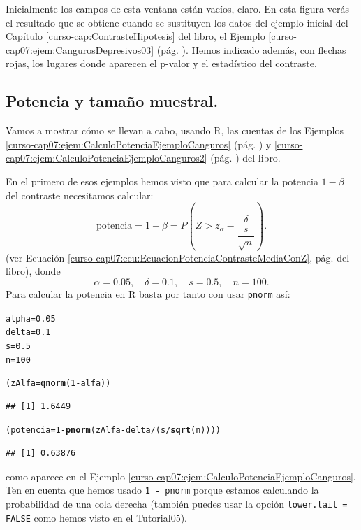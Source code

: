 \documentclass[10pt,a4paper]{article}\usepackage[]{graphicx}\usepackage[]{color}
\makeatletter
\newcommand{\hlnum}[1]{\textcolor[rgb]{0.686,0.059,0.569}{#1}}%
\newcommand{\hlopt}[1]{\textcolor[rgb]{0,0,0}{#1}}%
\newcommand{\hlstd}[1]{\textcolor[rgb]{0.345,0.345,0.345}{#1}}%
\newcommand{\hlkwb}[1]{\textcolor[rgb]{0.69,0.353,0.396}{#1}}%
\newcommand{\hlkwd}[1]{\textcolor[rgb]{0.737,0.353,0.396}{\textbf{#1}}}%
\newenvironment{kframe}{%
 \def\at@end@of@kframe{}%
 \ifinner\ifhmode%
  \def\at@end@of@kframe{\end{minipage}}%
  \begin{minipage}{\columnwidth}%
 \fi\fi%
 \def\FrameCommand##1{\hskip\@totalleftmargin \hskip-\fboxsep
 \colorbox{shadecolor}{##1}\hskip-\fboxsep
     \hskip-\linewidth \hskip-\@totalleftmargin \hskip\columnwidth}%
 \MakeFramed {\advance\hsize-\width
   \@totalleftmargin\z@ \linewidth\hsize
   \@setminipage}}%
 {\par\unskip\endMakeFramed%
 \at@end@of@kframe}
\newenvironment{knitrout}{}{} %
\newcounter {cont01}
\makeatother
\begin{document}
Inicialmente los campos de esta ventana están vacíos, claro. En esta figura verás el resultado que se obtiene cuando se sustituyen los datos del ejemplo inicial del Capítulo \ref{curso-cap:ContrasteHipotesis} del libro, el Ejemplo \ref{curso-cap07:ejem:CangurosDepresivos03} (pág. \pageref{curso-cap07:ejem:CangurosDepresivos03}). Hemos indicado además, con flechas rojas, los lugares donde aparecen el p-valor y el estadístico del contraste.


\subsection{Potencia y tamaño muestral.}

Vamos a mostrar cómo se llevan a cabo, usando R, las cuentas de los Ejemplos \ref{curso-cap07:ejem:CalculoPotenciaEjemploCanguros} (pág. \pageref{curso-cap07:ejem:CalculoPotenciaEjemploCanguros}) y \ref{curso-cap07:ejem:CalculoPotenciaEjemploCanguros2} (pág. \pageref{curso-cap07:ejem:CalculoPotenciaEjemploCanguros2}) del libro.

En el primero de esos ejemplos hemos visto que para calcular la potencia $1-\beta$ del contraste necesitamos calcular:
\[
    \mbox{potencia}=1-\beta=P\left(Z> z_{\alpha}-\dfrac{\delta}{\dfrac{s}{\sqrt{n}}}\right).
\]
(ver Ecuación \ref{curso-cap07:ecu:EcuacionPotenciaContrasteMediaConZ}, pág. \pageref{curso-cap07:ecu:EcuacionPotenciaContrasteMediaConZ} del libro), donde
    \[\alpha=0.05,\quad \delta=0.1,\quad  s=0.5,\quad  n=100.\]
Para calcular la potencia en R basta por tanto con usar  {\tt pnorm} así:
\begin{knitrout}
\color{fgcolor}\begin{kframe}
\begin{alltt}
\hlstd{alpha} \hlkwb{=} \hlnum{0.05}
\hlstd{delta} \hlkwb{=} \hlnum{0.1}
\hlstd{s} \hlkwb{=} \hlnum{0.5}
\hlstd{n} \hlkwb{=} \hlnum{100}

\hlstd{(zAlfa} \hlkwb{=} \hlkwd{qnorm}\hlstd{(}\hlnum{1}\hlopt{-} \hlstd{alfa))}
\end{alltt}
\begin{verbatim}
## [1] 1.6449
\end{verbatim}
\begin{alltt}
\hlstd{(potencia} \hlkwb{=} \hlnum{1} \hlopt{-} \hlkwd{pnorm}\hlstd{(zAlfa} \hlopt{-} \hlstd{delta} \hlopt{/} \hlstd{(s} \hlopt{/} \hlkwd{sqrt}\hlstd{(n)) ))}
\end{alltt}
\begin{verbatim}
## [1] 0.63876
\end{verbatim}
\end{kframe}
\end{knitrout}
como aparece en el Ejemplo \ref{curso-cap07:ejem:CalculoPotenciaEjemploCanguros}. Ten en cuenta que hemos usado {\tt 1 - pnorm} porque estamos calculando la probabilidad de una cola derecha (también puedes usar la opción {\tt lower.tail = FALSE} como hemos visto en el Tutorial05).
\end{document}
